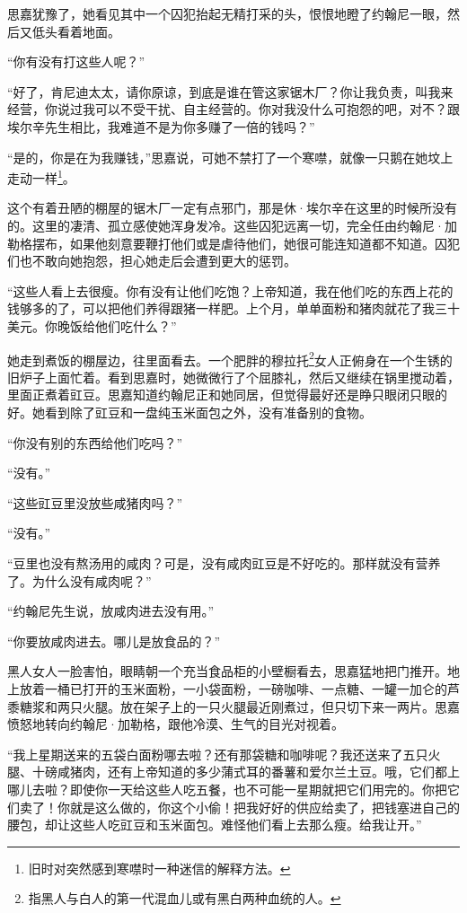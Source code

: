 \par 思嘉犹豫了，她看见其中一个囚犯抬起无精打采的头，恨恨地瞪了约翰尼一眼，然后又低头看着地面。
\par “你有没有打这些人呢？”
\par “好了，肯尼迪太太，请你原谅，到底是谁在管这家锯木厂？你让我负责，叫我来经营，你说过我可以不受干扰、自主经营的。你对我没什么可抱怨的吧，对不？跟埃尔辛先生相比，我难道不是为你多赚了一倍的钱吗？”
\par “是的，你是在为我赚钱，”思嘉说，可她不禁打了一个寒噤，就像一只鹅在她坟上走动一样\footnote{旧时对突然感到寒噤时一种迷信的解释方法。}。
\par 这个有着丑陋的棚屋的锯木厂一定有点邪门，那是休·埃尔辛在这里的时候所没有的。这里的凄清、孤立感使她浑身发冷。这些囚犯远离一切，完全任由约翰尼·加勒格摆布，如果他刻意要鞭打他们或是虐待他们，她很可能连知道都不知道。囚犯们也不敢向她抱怨，担心她走后会遭到更大的惩罚。
\par “这些人看上去很瘦。你有没有让他们吃饱？上帝知道，我在他们吃的东西上花的钱够多的了，可以把他们养得跟猪一样肥。上个月，单单面粉和猪肉就花了我三十美元。你晚饭给他们吃什么？”
\par 她走到煮饭的棚屋边，往里面看去。一个肥胖的穆拉托\footnote{指黑人与白人的第一代混血儿或有黑白两种血统的人。}女人正俯身在一个生锈的旧炉子上面忙着。看到思嘉时，她微微行了个屈膝礼，然后又继续在锅里搅动着，里面正煮着豇豆。思嘉知道约翰尼正和她同居，但觉得最好还是睁只眼闭只眼的好。她看到除了豇豆和一盘纯玉米面包之外，没有准备别的食物。
\par “你没有别的东西给他们吃吗？”
\par “没有。”
\par “这些豇豆里没放些咸猪肉吗？”
\par “没有。”
\par “豆里也没有熬汤用的咸肉？可是，没有咸肉豇豆是不好吃的。那样就没有营养了。为什么没有咸肉呢？”
\par “约翰尼先生说，放咸肉进去没有用。”
\par “你要放咸肉进去。哪儿是放食品的？”
\par 黑人女人一脸害怕，眼睛朝一个充当食品柜的小壁橱看去，思嘉猛地把门推开。地上放着一桶已打开的玉米面粉，一小袋面粉，一磅咖啡、一点糖、一罐一加仑的芦黍糖浆和两只火腿。放在架子上的一只火腿最近刚煮过，但只切下来一两片。思嘉愤怒地转向约翰尼·加勒格，跟他冷漠、生气的目光对视着。
\par “我上星期送来的五袋白面粉哪去啦？还有那袋糖和咖啡呢？我还送来了五只火腿、十磅咸猪肉，还有上帝知道的多少蒲式耳的番薯和爱尔兰土豆。哦，它们都上哪儿去啦？即使你一天给这些人吃五餐，也不可能一星期就把它们用完的。你把它们卖了！你就是这么做的，你这个小偷！把我好好的供应给卖了，把钱塞进自己的腰包，却让这些人吃豇豆和玉米面包。难怪他们看上去那么瘦。给我让开。”
